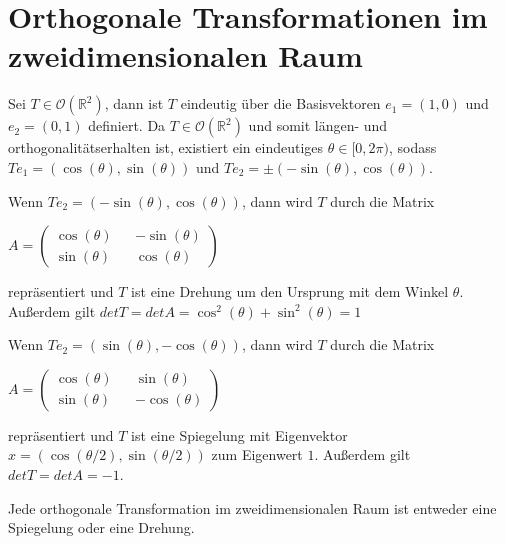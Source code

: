 \section{Orthogonale Transformationen im zweidimensionalen Raum}
\begin{bem}
 Sei $T \in \mathcal{O}(\mathbb{R}^2)$, dann ist $T$ eindeutig über die Basisvektoren $e_1=(1,0)$ und $e_2=(0,1)$ definiert. Da $T \in \mathcal{O}(\mathbb{R}^2)$ und somit längen- und orthogonalitätserhalten ist, existiert ein eindeutiges $\theta \in [0,2 \pi)$, sodass $Te_1=(\cos(\theta),\sin(\theta))$ und $Te_2=\pm(-\sin(\theta),\cos(\theta))$.
 
 Wenn $Te_2=(-\sin(\theta),\cos(\theta))$, dann wird $T$ durch die Matrix 
 \begin{center}
  $A = \begin{pmatrix}
        \cos(\theta) && -\sin(\theta) \\
        \sin(\theta) && \cos(\theta)
       \end{pmatrix}$

 \end{center}
repräsentiert und $T$ ist eine Drehung um den Ursprung mit dem Winkel $\theta$. Außerdem gilt $det T = det A = \cos^2(\theta) + \sin^2(\theta) = 1$

Wenn $Te_2=(\sin(\theta),-\cos(\theta))$, dann wird $T$ durch die Matrix 
 \begin{center}
  $A = \begin{pmatrix}
        \cos(\theta) && \sin(\theta) \\
        \sin(\theta) && -\cos(\theta)
       \end{pmatrix}$

 \end{center}
repräsentiert und $T$ ist eine Spiegelung mit Eigenvektor $x=(\cos(\theta/2),\sin(\theta/2))$ zum Eigenwert $1$. Außerdem gilt $det T = det A = -1$. 
\end{bem}
\begin{theorem}
 Jede orthogonale Transformation im zweidimensionalen Raum ist entweder eine Spiegelung oder eine Drehung.
\end{theorem}
